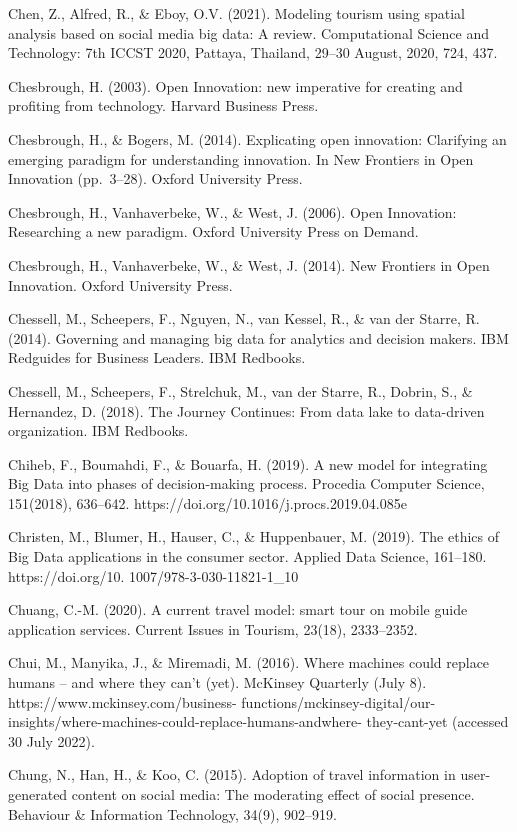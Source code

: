 \documentclass[
  letterpaper,
  DIV=11,
  numbers=noendperiod]{scrreprt}
\begin{document}
Chen, Z., Alfred, R., \& Eboy, O.V. (2021). Modeling tourism using
spatial analysis based on social media big data: A review. Computational
Science and Technology: 7th ICCST 2020, Pattaya, Thailand, 29--30
August, 2020, 724, 437.

Chesbrough, H. (2003). Open Innovation: new imperative for creating and
profiting from technology. Harvard Business Press.

Chesbrough, H., \& Bogers, M. (2014). Explicating open innovation:
Clarifying an emerging paradigm for understanding innovation. In New
Frontiers in Open Innovation (pp.~3--28). Oxford University Press.

Chesbrough, H., Vanhaverbeke, W., \& West, J. (2006). Open Innovation:
Researching a new paradigm. Oxford University Press on Demand.

Chesbrough, H., Vanhaverbeke, W., \& West, J. (2014). New Frontiers in
Open Innovation. Oxford University Press.

Chessell, M., Scheepers, F., Nguyen, N., van Kessel, R., \& van der
Starre, R. (2014). Governing and managing big data for analytics and
decision makers. IBM Redguides for Business Leaders. IBM Redbooks.

Chessell, M., Scheepers, F., Strelchuk, M., van der Starre, R., Dobrin,
S., \& Hernandez, D. (2018). The Journey Continues: From data lake to
data-driven organization. IBM Redbooks.

Chiheb, F., Boumahdi, F., \& Bouarfa, H. (2019). A new model for
integrating Big Data into phases of decision-making process. Procedia
Computer Science, 151(2018), 636--642.
https://doi.org/10.1016/j.procs.2019.04.085e

Christen, M., Blumer, H., Hauser, C., \& Huppenbauer, M. (2019). The
ethics of Big Data applications in the consumer sector. Applied Data
Science, 161--180. https://doi.org/10. 1007/978-3-030-11821-1\_10

Chuang, C.-M. (2020). A current travel model: smart tour on mobile guide
application services. Current Issues in Tourism, 23(18), 2333--2352.

Chui, M., Manyika, J., \& Miremadi, M. (2016). Where machines could
replace humans -- and where they can't (yet). McKinsey Quarterly (July
8). https://www.mckinsey.com/business-
functions/mckinsey-digital/our-insights/where-machines-could-replace-humans-andwhere-
they-cant-yet (accessed 30 July 2022).

Chung, N., Han, H., \& Koo, C. (2015). Adoption of travel information in
user-generated content on social media: The moderating effect of social
presence. Behaviour \& Information Technology, 34(9), 902--919.
\end{document}
